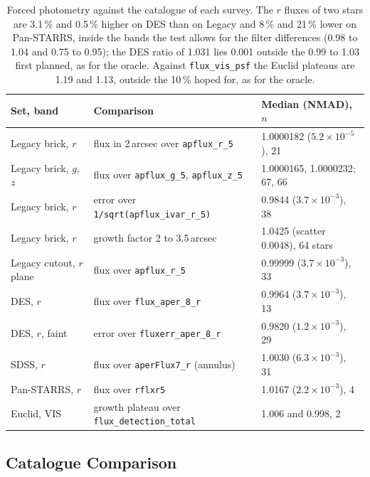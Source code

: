 \documentclass[11pt,a4paper]{article}
\newcommand{\code}[1]{\texttt{\small #1}}
\begin{document}
    \begin{table}[H]
        \centering
        \small
        \begin{tabularx}{\textwidth}{lXl}
            \toprule
            \textbf{Set, band} & \textbf{Comparison} & \textbf{Median (NMAD), $n$} \\
            \midrule
            Legacy brick, $r$ & flux in 2\,arcsec over \code{apflux\_r\_5} & 1.0000182 ($5.2 \times 10^{-5}$), 21 \\
            Legacy brick, $g$, $z$ & flux over \code{apflux\_g\_5}, \code{apflux\_z\_5} & 1.0000165, 1.0000232; 67, 66 \\
            Legacy brick, $r$ & error over \code{1/sqrt(apflux\_ivar\_r\_5)} & 0.9844 ($3.7 \times 10^{-3}$), 38 \\
            Legacy brick, $r$ & growth factor 2 to 3.5\,arcsec & 1.0425 (scatter 0.0048), 64 stars \\
            Legacy cutout, $r$ plane & flux over \code{apflux\_r\_5} & 0.99999 ($3.7 \times 10^{-3}$), 33 \\
            DES, $r$ & flux over \code{flux\_aper\_8\_r} & 0.9964 ($3.7 \times 10^{-3}$), 13 \\
            DES, $r$, faint & error over \code{fluxerr\_aper\_8\_r} & 0.9820 ($1.2 \times 10^{-3}$), 29 \\
            SDSS, $r$ & flux over \code{aperFlux7\_r} (annulus) & 1.0030 ($6.3 \times 10^{-3}$), 31 \\
            Pan-STARRS, $r$ & flux over \code{rflxr5} & 1.0167 ($2.2 \times 10^{-3}$), 4 \\
            Euclid, VIS & growth plateau over \code{flux\_detection\_total} & 1.006 and 0.998, 2 \\
            \bottomrule
        \end{tabularx}
        \caption{Forced photometry against the catalogue of each survey. The $r$ fluxes of two stars are 3.1\,\% and 0.5\,\% higher on DES than on Legacy and 8\,\% and 21\,\% lower on Pan-STARRS, inside the bands the test allows for the filter differences (0.98 to 1.04 and 0.75 to 0.95); the DES ratio of 1.031 lies 0.001 outside the 0.99 to 1.03 first planned, as for the oracle. Against \code{flux\_vis\_psf} the Euclid plateaus are 1.19 and 1.13, outside the 10\,\% hoped for, as for the oracle.}
    \end{table}

    \subsection{Catalogue Comparison}
    \label{sec:catcompare}
\end{document}
